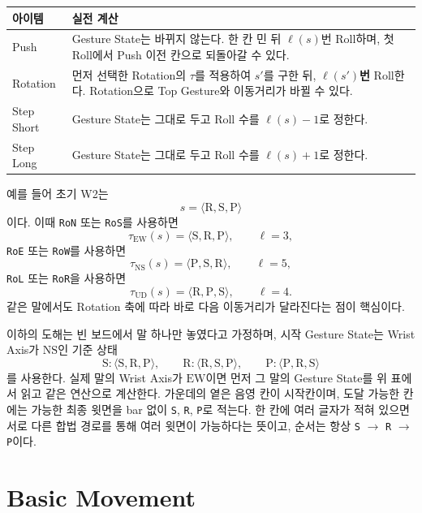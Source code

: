 \begin{center}
    \renewcommand{\arraystretch}{1.18}
    \begin{tabular}{@{}L{0.17\textwidth}L{0.71\textwidth}@{}}
        \toprule
        아이템 & 실전 계산 \\
        \midrule
        Push & Gesture State는 바뀌지 않는다. 한 칸 민 뒤 $\ell(s)$번 Roll하며, 첫 Roll에서 Push 이전 칸으로 되돌아갈 수 있다. \\
        Rotation & 먼저 선택한 Rotation의 $\tau$를 적용하여 $s'$를 구한 뒤, \textbf{$\ell(s')$번} Roll한다. Rotation으로 Top Gesture와 이동거리가 바뀔 수 있다. \\
        Step Short & Gesture State는 그대로 두고 Roll 수를 $\ell(s)-1$로 정한다. \\
        Step Long & Gesture State는 그대로 두고 Roll 수를 $\ell(s)+1$로 정한다. \\
        \bottomrule
    \end{tabular}
\end{center}

예를 들어 초기 W2는
\[
    s=\langle \mathrm{R},\mathrm{S},\mathrm{P}\rangle
\]
이다. 이때 \texttt{RoN} 또는 \texttt{RoS}를 사용하면
\[
    \tau_{\mathrm{EW}}(s)=\langle \mathrm{S},\mathrm{R},\mathrm{P}\rangle,
    \qquad \ell=3,
\]
\texttt{RoE} 또는 \texttt{RoW}를 사용하면
\[
    \tau_{\mathrm{NS}}(s)=\langle \mathrm{P},\mathrm{S},\mathrm{R}\rangle,
    \qquad \ell=5,
\]
\texttt{RoL} 또는 \texttt{RoR}을 사용하면
\[
    \tau_{\mathrm{UD}}(s)=\langle \mathrm{R},\mathrm{P},\mathrm{S}\rangle,
    \qquad \ell=4.
\]
같은 말에서도 Rotation 축에 따라 바로 다음 이동거리가 달라진다는 점이 핵심이다.

이하의 도해는 빈 보드에서 말 하나만 놓였다고 가정하며, 시작 Gesture State는 Wrist Axis가 $\mathrm{NS}$인 기준 상태
\[
    \mathrm{S}:\langle \mathrm{S},\mathrm{R},\mathrm{P}\rangle,\qquad
    \mathrm{R}:\langle \mathrm{R},\mathrm{S},\mathrm{P}\rangle,\qquad
    \mathrm{P}:\langle \mathrm{P},\mathrm{R},\mathrm{S}\rangle
\]
를 사용한다. 실제 말의 Wrist Axis가 $\mathrm{EW}$이면 먼저 그 말의 Gesture State를 위 표에서 읽고 같은 연산으로 계산한다. 가운데의 옅은 음영 칸이 시작칸이며, 도달 가능한 칸에는 가능한 최종 윗면을 bar 없이 \texttt{S}, \texttt{R}, \texttt{P}로 적는다. 한 칸에 여러 글자가 적혀 있으면 서로 다른 합법 경로를 통해 여러 윗면이 가능하다는 뜻이고, 순서는 항상 \texttt{S} $\rightarrow$ \texttt{R} $\rightarrow$ \texttt{P}이다.

\section{Basic Movement}

